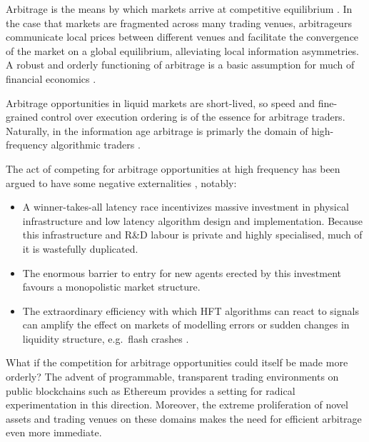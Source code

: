 Arbitrage is the means by which markets arrive at competitive equilibrium \cite{nau1991arbitrage}.
%
In the case that markets are fragmented across many trading venues, arbitrageurs communicate local prices between different venues and facilitate the convergence of the market on a global equilibrium, alleviating local information asymmetries.
%
A robust and orderly functioning of arbitrage is a basic assumption for much of financial economics \cite{modigliani1958cost,werner1987arbitrage,varian1987arbitrage}.

Arbitrage opportunities in liquid markets are short-lived, so speed and fine-grained control over execution ordering is of the essence for arbitrage traders.
%
Naturally, in the information age arbitrage is primarly the domain of high-frequency algorithmic traders \cite[Part II]{yadav2015algorithmic}.

The act of competing for arbitrage opportunities at high frequency has been argued to have some negative externalities \cite{yadav2015algorithmic,budish2015high,daian2020flash}, notably:
\begin{itemize}
  \item 
    A winner-takes-all latency race incentivizes massive investment in physical infrastructure and low latency algorithm design and implementation.
    Because this infrastructure and R\&D labour is private and highly specialised, much of it is wastefully duplicated.
    
  \item 
    The enormous barrier to entry for new agents erected by this investment favours a monopolistic market structure.

  \item
    The extraordinary efficiency with which HFT algorithms can react to signals can amplify the effect on markets of modelling errors or sudden changes in liquidity structure, e.g.~flash crashes \cite[1628]{yadav2015algorithmic}.

  \end{itemize}

What if the competition for arbitrage opportunities could itself be made more orderly?
%
The advent of programmable, transparent trading environments on public blockchains such as Ethereum provides a setting for radical experimentation in this direction.
%
Moreover, the extreme proliferation of novel assets and trading venues on these domains makes the need for efficient arbitrage even more immediate.




